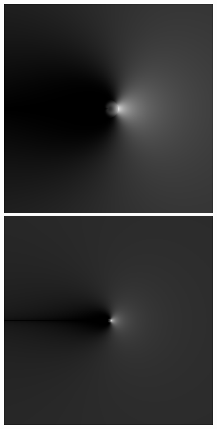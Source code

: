 \begin{figure}
{ }
 \subtop
 {
 \includegraphics[scale=0.115]{figures/dfilt_wr_sqrt2.png}
 }
 \hfill
 \subtop
 {
 \includegraphics[scale=0.115]{figures/dfilt_wr_sqrt8.png}
 }
 \hfill
 \subtop

\end{figure}
